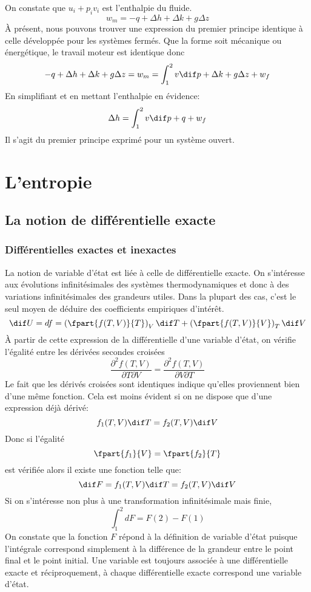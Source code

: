 On constate que $u_i + p_iv_i$ est l'enthalpie du fluide.
\[ w_m = -q + \Delta h + \Delta k +g \Delta z \]
À présent, nous pouvons trouver une expression
du premier principe identique à celle développée pour les systèmes fermés.
Que la forme soit mécanique ou énergétique,
le travail moteur est identique donc
\[ -q + \Delta h + \Delta k + g \Delta z = w_m =
\int_1^2v\dif p + \Delta k + g\Delta z + w_f \]
En simplifiant et en mettant l'enthalpie en évidence:
\[ \Delta h = \int_1^2v\dif p + q + w_f \]
Il s'agit du premier principe exprimé pour un système ouvert.

\section{L'entropie}
\subsection{La notion de différentielle exacte}
\subsubsection{Différentielles exactes et inexactes}
La notion de variable d'état est liée à celle de différentielle exacte.
On s'intéresse aux évolutions infinitésimales des systèmes thermodynamiques et
donc à des variations infinitésimales des grandeurs utiles.
Dans la plupart des cas,
c'est le seul moyen de déduire des coefficients empiriques d'intérêt.
\[ \dif U = df = \left(\fpart{f(T,V)}{T}\right)_V \dif T +
\left ( \fpart{f(T,V)}{V}\right ) _T \dif V \]
À partir de cette expression de la différentielle d'une variable d'état,
on vérifie l'égalité entre les dérivées secondes croisées
\[ \frac{\partial^2 f(T,V)}{\partial T \partial V} =
\frac{\partial^2 f(T,V)}{\partial V \partial T} \]
Le fait que les dérivés croisées sont identiques indique
qu'elles proviennent bien d'une même fonction.
Cela est moins évident si on ne dispose que d'une expression déjà dérivé:
\[ f_1(T,V) \dif T = f_2(T,V)\dif V \]
Donc si l'égalité
\[ \fpart{f_1}{V} = \fpart{f_2}{T} \]
est vérifiée alors il existe une fonction telle que:
\[ \dif F = f_1(T,V) \dif T = f_2(T,V)\dif V  \]
Si on s'intéresse non plus à une transformation infinitésimale mais finie,
\[ \int_1^2 dF = F(2)-F(1) \]
On constate que la fonction $F$ répond à la définition de variable d'état
puisque l'intégrale correspond simplement à la différence
de la grandeur entre le point final et le point initial.
Une variable est toujours associée à une différentielle exacte et
réciproquement, à chaque différentielle exacte correspond une variable d'état.

